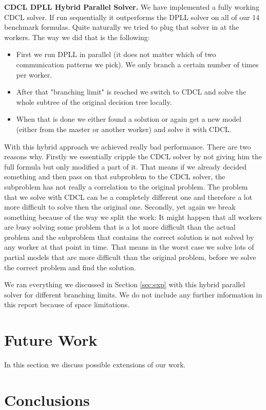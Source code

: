 \documentclass[letterpaper]{article}
\newcommand{\mypar}[1]{{\bf #1.}}
\begin{document}
\mypar{CDCL DPLL Hybrid Parallel Solver}
We have implemented a fully working CDCL solver.
If run sequentially it outperforms the DPLL solver on all of our 14 benchmark formulas.
Quite naturally we tried to plug that solver in at the workers.
The way we did that is the following:
\begin{itemize}
    \item First we run DPLL in parallel (it does not matter which of two communication patterns we pick).
    We only branch a certain number of times per worker.
    \item After that "branching limit" is reached we switch to CDCL and solve the whole subtree of the original decision tree locally.
    \item When that is done we either found a solution or again get a new model (either from the master or another worker) and solve it with CDCL.
\end{itemize}
With this hybrid approach we achieved really bad performance.
There are two reasons why.
Firstly we essentially cripple the CDCL solver by not giving him the full formula but only modified a part of it.
That means if we already decided something and then pass on that subproblem to the CDCL solver, the subproblem has not really a correlation to the original problem.
The problem that we solve with CDCL can be a completely different one and therefore a lot more difficult to solve then the original one.
Secondly, yet again we break something because of the way we split the work:
It might happen that all workers are busy solving some problem that is a lot more difficult than the actual problem and the subproblem that contains the correct solution is not solved by any worker at that point in time.
That means in the worst case we solve lots of partial models that are more difficult than the original problem, before we solve the correct problem and find the solution.

We ran everything we discussed in Section \ref{sec:exp} with this hybrid parallel solver for different branching limits.
We do not include any further information in this report because of space limitations.

\section{Future Work}
In this section we discuss possible extensions of our work.

\section{Conclusions}
\end{document}
